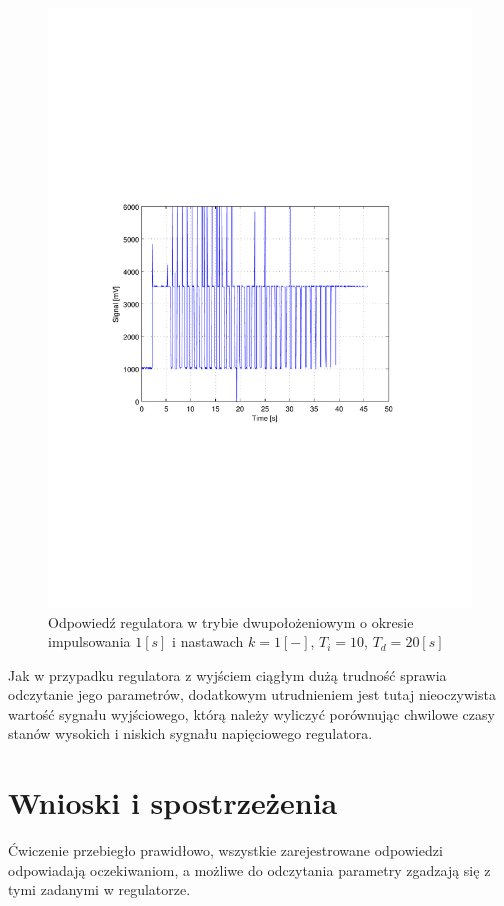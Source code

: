 \documentclass[12pt]{article}
\begin{document}
\begin{figure}[!htb]
	\begin{center}
		\includegraphics[width=12cm,trim=3cm 9cm 3cm 9cm,clip]
		{../res/img/dis_1_10_20.pdf}
	\end{center} 
	\caption{Odpowiedź regulatora w trybie dwupołożeniowym o okresie impulsowania
	$1[s]$ i nastawach $k=1[-]$, $T_i=10$, $T_d=20[s]$}
\end{figure}

Jak w przypadku regulatora z wyjściem ciągłym dużą trudność sprawia odczytanie
jego parametrów, dodatkowym utrudnieniem jest tutaj nieoczywista wartość sygnału
wyjściowego, którą należy wyliczyć porównując chwilowe czasy stanów wysokich i
niskich sygnału napięciowego regulatora.

\section{Wnioski i spostrzeżenia}

Ćwiczenie przebiegło prawidłowo, wszystkie zarejestrowane odpowiedzi odpowiadają
oczekiwaniom, a możliwe do odczytania parametry zgadzają się z tymi zadanymi w
regulatorze.
\end{document}
